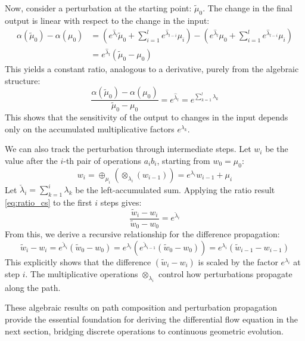\documentclass[12pt]{article}
\begin{document}
Now, consider a perturbation at the starting point: \( \tilde{\mu}_0 \). The change in the final output is linear with respect to the change in the input:
\begin{align}
\alpha(\tilde{\mu}_0) - \alpha(\mu_0) &= (e^{\hat{\lambda}_l} \tilde{\mu}_0 + \sum_{i=1}^l e^{\hat{\lambda}_{l-i}} \mu_i) - (e^{\hat{\lambda}_l} \mu_0 + \sum_{i=1}^l e^{\hat{\lambda}_{l-i}} \mu_i) \\
&= e^{\hat{\lambda}_l} (\tilde{\mu}_0 - \mu_0)
\end{align}
This yields a constant ratio, analogous to a derivative, purely from the algebraic structure:
\begin{equation}
\frac{\alpha(\tilde{\mu}_0) - \alpha(\mu_0)}{\tilde{\mu}_0 - \mu_0} = e^{\hat{\lambda}_l} = e^{\sum_{k=1}^l \lambda_k} \label{eq:ratio_cs}
\end{equation}
This shows that the sensitivity of the output to changes in the input depends only on the accumulated multiplicative factors \( e^{\lambda_k} \).

We can also track the perturbation through intermediate steps. Let \( w_i \) be the value after the \( i \)-th pair of operations \( a_i b_i \), starting from \( w_0 = \mu_0 \):
\[
w_i = \oplus_{\mu_i}( \otimes_{\lambda_i}(w_{i-1}) ) = e^{\lambda_i} w_{i-1} + \mu_i
\]
Let \( \check{\lambda}_i = \sum_{k=1}^i \lambda_k \) be the left-accumulated sum. Applying the ratio result \eqref{eq:ratio_cs} to the first \( i \) steps gives:
\begin{equation}
\frac{\tilde{w}_i - w_i}{\tilde{w}_0 - w_0} = e^{\check{\lambda}_i} \label{eq:perturbation1_cs}
\end{equation}
From this, we derive a recursive relationship for the difference propagation:
\begin{equation}
\tilde{w}_i - w_i = e^{\check{\lambda}_i} (\tilde{w}_0 - w_0) = e^{\lambda_i} (e^{\check{\lambda}_{i-1}} (\tilde{w}_0 - w_0)) = e^{\lambda_i}(\tilde{w}_{i - 1} - w_{i - 1}) \label{eq:perturbation2_cs}
\end{equation}
This explicitly shows that the difference \( (\tilde{w}_i - w_i) \) is scaled by the factor \( e^{\lambda_i} \) at step \( i \). The multiplicative operations \( \otimes_{\lambda_i} \) control how perturbations propagate along the path.

These algebraic results on path composition and perturbation propagation provide the essential foundation for deriving the differential flow equation in the next section, bridging discrete operations to continuous geometric evolution.
\end{document}

